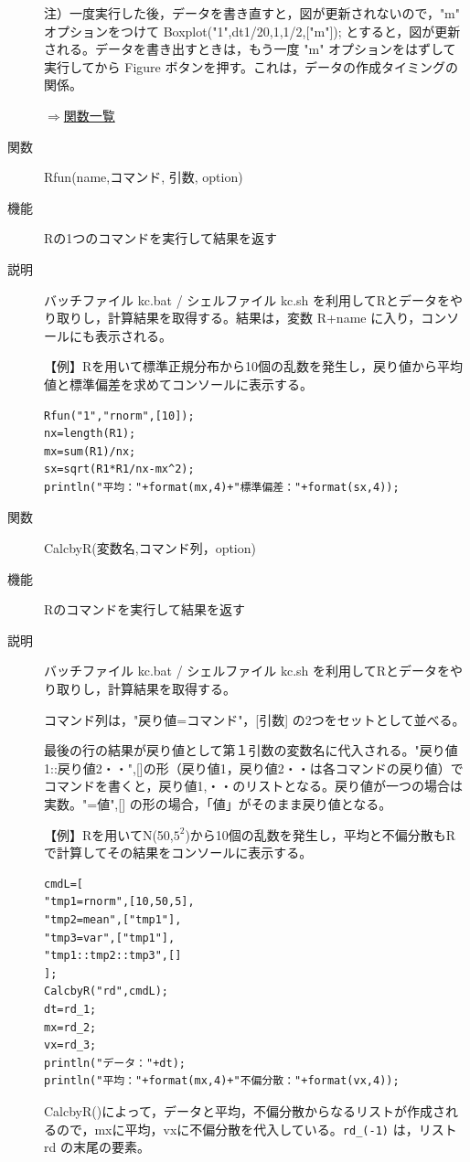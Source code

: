 \documentclass[papersize,a4paper,12pt,uplatex]{jsarticle}
\begin{document}
\begin{description}
注）一度実行した後，データを書き直すと，図が更新されないので，"m" オプションをつけて
Boxplot("1",dt1/20,1,1/2,["m"]); とすると，図が更新される。データを書き出すときは，もう一度 "m" オプションをはずして実行してから Figure ボタンを押す。これは，データの作成タイミングの関係。

\begin{flushright}\hyperlink{functionlist}{$\Rightarrow$関数一覧}\end{flushright}

\hypertarget{rfun}{}
\item[関数]Rfun(name,コマンド, 引数, option)
\item[機能]Rの1つのコマンドを実行して結果を返す
\item[説明]バッチファイル kc.bat / シェルファイル kc.sh を利用してRとデータをやり取りし，計算結果を取得する。結果は，変数 R+name に入り，コンソールにも表示される。

\vspace{\baselineskip}
【例】Rを用いて標準正規分布から10個の乱数を発生し，戻り値から平均値と標準偏差を求めてコンソールに表示する。
\begin{verbatim}
Rfun("1","rnorm",[10]);
nx=length(R1);
mx=sum(R1)/nx;
sx=sqrt(R1*R1/nx-mx^2);
println("平均："+format(mx,4)+"標準偏差："+format(sx,4));
\end{verbatim}

\hypertarget{calcbyr}{}
\item[関数]CalcbyR(変数名,コマンド列，option)
\item[機能]Rのコマンドを実行して結果を返す
\item[説明]バッチファイル kc.bat / シェルファイル kc.sh を利用してRとデータをやり取りし，計算結果を取得する。

コマンド列は，"戻り値=コマンド"，[引数] の2つをセットとして並べる。

最後の行の結果が戻り値として第１引数の変数名に代入される。"戻り値1::戻り値2・・",[]の形（戻り値1，戻り値2・・は各コマンドの戻り値）でコマンドを書くと，戻り値1,・・のリストとなる。戻り値が一つの場合は実数。"=値",[] の形の場合，「値」がそのまま戻り値となる。

\vspace{\baselineskip}
【例】Rを用いてN(50,$5^2$)から10個の乱数を発生し，平均と不偏分散もRで計算してその結果をコンソールに表示する。
\begin{verbatim}
cmdL=[
"tmp1=rnorm",[10,50,5],
"tmp2=mean",["tmp1"],
"tmp3=var",["tmp1"],
"tmp1::tmp2::tmp3",[]
];
CalcbyR("rd",cmdL);
dt=rd_1;
mx=rd_2;
vx=rd_3;
println("データ："+dt);
println("平均："+format(mx,4)+"不偏分散："+format(vx,4));
\end{verbatim}
CalcbyR()によって，データと平均，不偏分散からなるリストが作成されるので，mxに平均，vxに不偏分散を代入している。\verb|rd_(-1)| は，リスト rd の末尾の要素。


\end{description}
\end{document}

